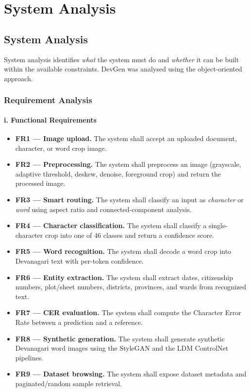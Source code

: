 \documentclass[12pt,a4paper]{report}
\begin{document}
\chapter{System Analysis}

\section{System Analysis}
System analysis identifies \textit{what} the system must do and \textit{whether} it can be built within the available constraints. DevGen was analysed using the object-oriented approach.

\subsection{Requirement Analysis}

\subsubsection{i. Functional Requirements}
\begin{itemize}[itemsep=2pt]
  \item \textbf{FR1 --- Image upload.} The system shall accept an uploaded document, character, or word crop image.
  \item \textbf{FR2 --- Preprocessing.} The system shall preprocess an image (grayscale, adaptive threshold, deskew, denoise, foreground crop) and return the processed image.
  \item \textbf{FR3 --- Smart routing.} The system shall classify an input as \textit{character} or \textit{word} using aspect ratio and connected-component analysis.
  \item \textbf{FR4 --- Character classification.} The system shall classify a single-character crop into one of 46 classes and return a confidence score.
  \item \textbf{FR5 --- Word recognition.} The system shall decode a word crop into Devanagari text with per-token confidence.
  \item \textbf{FR6 --- Entity extraction.} The system shall extract dates, citizenship numbers, plot/sheet numbers, districts, provinces, and wards from recognized text.
  \item \textbf{FR7 --- CER evaluation.} The system shall compute the Character Error Rate between a prediction and a reference.
  \item \textbf{FR8 --- Synthetic generation.} The system shall generate synthetic Devanagari word images using the StyleGAN and the LDM ControlNet pipelines.
  \item \textbf{FR9 --- Dataset browsing.} The system shall expose dataset metadata and paginated/random sample retrieval.
\end{itemize}
\end{document}
